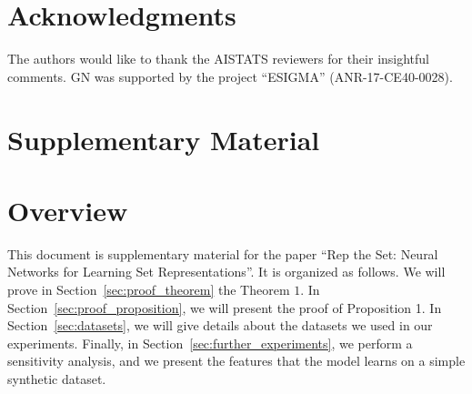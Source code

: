 \documentclass[twoside]{article}
\begin{document}
\section*{Acknowledgments}
The authors would like to thank the AISTATS reviewers for their insightful comments.
GN was supported by the project ``ESIGMA'' (ANR-17-CE40-0028).



\clearpage
\appendix

\section*{Supplementary Material}

\section{Overview}
This document is supplementary material for the paper ``Rep the Set: Neural Networks for Learning Set Representations''.
It is organized as follows.
We will prove in Section~\ref{sec:proof_theorem} the Theorem $1$.
In Section~\ref{sec:proof_proposition}, we will present the proof of Proposition 1.
In Section~\ref{sec:datasets}, we will give details about the datasets we used in our experiments.
Finally, in Section~\ref{sec:further_experiments}, we perform a sensitivity analysis, and we present the features that the model learns on a simple synthetic dataset.
\end{document}
